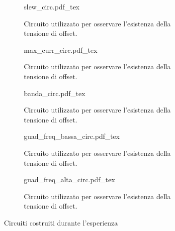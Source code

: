 \begin{figure*}[t]
        \centering
        \small
        \begin{subfigure}[b]{0.35\textwidth}
            \def\svgwidth{\columnwidth}
            {slew_circ.pdf_tex}
            \caption{Circuito utilizzato per osservare l'esistenza della tensione di offset.}
            \label{fig:slew_circ3}
        \end{subfigure}
        \quad
        \begin{subfigure}[b]{0.35\textwidth}
            \def\svgwidth{\columnwidth}
            {max_curr_circ.pdf_tex}
            \caption{Circuito utilizzato per osservare l'esistenza della tensione di offset.}
            \label{fig:max_curr_circ3}
        \end{subfigure}
        \quad
        \begin{subfigure}[b]{0.35\textwidth}
            \def\svgwidth{\columnwidth}
            {banda_circ.pdf_tex}
            \caption{Circuito utilizzato per osservare l'esistenza della tensione di offset.}
            \label{fig:banda_circ3}
        \end{subfigure}
        \quad
        \begin{subfigure}[b]{0.35\textwidth}
            \def\svgwidth{\columnwidth}
            {guad_freq_bassa_circ.pdf_tex}
            \caption{Circuito utilizzato per osservare l'esistenza della tensione di offset.}
            \label{fig:gain_low_circ3}
        \end{subfigure}
        \quad
        \begin{subfigure}[b]{0.35\textwidth}
            \def\svgwidth{\columnwidth}
            {guad_freq_alta_circ.pdf_tex}
            \caption{Circuito utilizzato per osservare l'esistenza della tensione di offset.}
            \label{fig:gain_high_circ3}
        \end{subfigure}

        \caption{Circuiti costruiti durante l'esperienza}
        \label{fig:circuits3}
\end{figure*}
